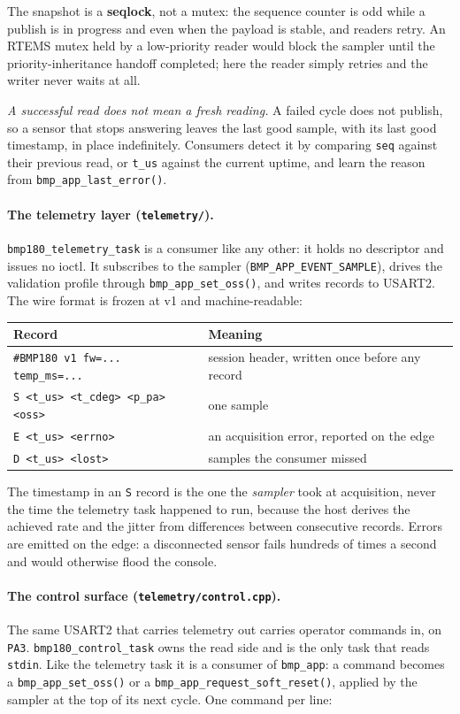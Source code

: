 \documentclass[10pt,a4]{article}
\begin{document}
The snapshot is a \textbf{seqlock}, not a mutex: the sequence counter is odd
while a publish is in progress and even when the payload is stable, and readers
retry. An RTEMS mutex held by a low-priority reader would block the sampler
until the priority-inheritance handoff completed; here the reader simply retries
and the writer never waits at all.

\emph{A successful read does not mean a fresh reading.} A failed cycle does not
publish, so a sensor that stops answering leaves the last good sample, with its
last good timestamp, in place indefinitely. Consumers detect it by comparing \texttt{seq} against their previous read, or
\texttt{t\_us} against the current uptime, and learn the reason from
\texttt{bmp\_app\_last\_error()}.

\paragraph{The telemetry layer (\texttt{telemetry/}).}
\texttt{bmp180\_telemetry\_task} is a consumer like any other: it holds no
descriptor and issues no ioctl. It subscribes to the sampler
(\texttt{BMP\_APP\_EVENT\_SAMPLE}), drives the validation profile through
\texttt{bmp\_app\_set\_oss()}, and writes records to USART2. The wire format is frozen at v1 and machine-readable:

\begin{center}
\begin{tabular}{ll}
Record & Meaning \\
\hline
\texttt{\#BMP180 v1 fw=... temp\_ms=...} & session header, written once before any record \\
\texttt{S <t\_us> <t\_cdeg> <p\_pa> <oss>} & one sample \\
\texttt{E <t\_us> <errno>} & an acquisition error, reported on the edge \\
\texttt{D <t\_us> <lost>} & samples the consumer missed \\
\end{tabular}
\end{center}

The timestamp in an \texttt{S} record is the one the \emph{sampler} took at
acquisition, never the time the telemetry task happened to run, because the host
derives the achieved rate and the jitter from differences between consecutive
records. Errors are emitted on the edge: a disconnected sensor fails hundreds of
times a second and would otherwise flood the console.

\paragraph{The control surface (\texttt{telemetry/control.cpp}).} The same
USART2 that carries telemetry out carries operator commands in, on \texttt{PA3}.
\texttt{bmp180\_control\_task} owns the read side and is the only task that reads
\texttt{stdin}. Like the telemetry task it is a consumer of \texttt{bmp\_app}: a
command becomes a \texttt{bmp\_app\_set\_oss()} or a
\texttt{bmp\_app\_request\_soft\_reset()}, applied by the sampler at the top of
its next cycle. One command per line:
\end{document}

